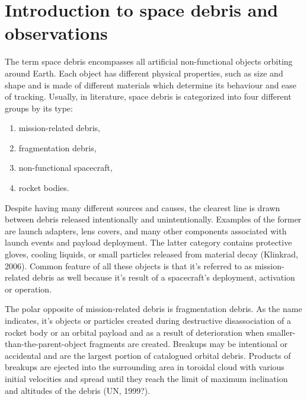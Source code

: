 \chapter{Introduction to space debris and observations}\label{chap:introduction}

The term space debris encompasses all artificial non-functional objects orbiting around Earth. Each object has different physical properties, such as size and shape and is made of different materials which determine its behaviour and ease of tracking. Usually, in literature, space debris is categorized into four different groups by its type:
\begin{enumerate}
	\item mission-related debris,
	\item fragmentation debris,
	\item non-functional spacecraft,
	\item rocket bodies.
\end{enumerate}

	Despite having many different sources and causes, the clearest line is drawn between debris released intentionally and unintentionally. Examples of the former are launch adapters, lens covers, and many other components associated with launch events and payload deployment. The latter category contains protective gloves, cooling liquids, or small particles released from material decay (Klinkrad, 2006). Common feature of all these objects is that it’s referred to as mission-related debris as well because it’s result of a spacecraft’s deployment, activation or operation.
	
	The polar opposite of mission-related debris is fragmentation debris. As the name indicates, it’s objects or particles created during destructive disassociation of a rocket body or an orbital payload and as a result of deterioration when smaller-than-the-parent-object fragments are created. Breakups may be intentional or accidental and are the largest portion of catalogued orbital debris. Products of breakups are ejected into the surrounding area in toroidal cloud with various initial velocities and spread until they reach the limit of maximum inclination and altitudes of the debris (UN, 1999?).
	
